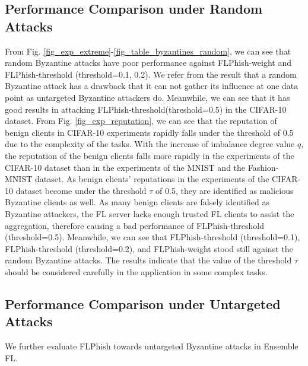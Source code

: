 \documentclass[journal]{IEEEtran}
\begin{document}
  \subsection{Performance Comparison under Random Attacks}
  From Fig. \ref{fig_exp_extreme}-\ref{fig_table_byzantines_random}, we can see that random Byzantine attacks have poor performance against FLPhish-weight and FLPhish-threshold (threshold=0.1, 0.2). We refer from the result that a random Byzantine attack has a drawback that it can not gather its influence at one data point as untargeted Byzantine attackers do. Meanwhile, we can see that it has good results in attacking FLPhish-threshold(threshold=0.5) in the CIFAR-10 dataset. From Fig. \ref{fig_exp_reputation}, we can see that the reputation of benign clients in CIFAR-10 experiments rapidly falls under the threshold of 0.5 due to the complexity of the tasks. With the increase of imbalance degree value $q$, the reputation of the benign clients falls more rapidly in the experiments of the CIFAR-10 dataset than in the experiments of the MNIST and the Fashion-MNIST dataset. As benign clients' reputations in the experiments of the CIFAR-10 dataset become under the threshold $\tau$ of 0.5, they are identified as malicious Byzantine clients as well. As many benign clients are falsely identified as Byzantine attackers, the FL server lacks enough trusted FL clients to assist the aggregation, therefore causing a bad performance of FLPhish-threshold (threshold=0.5). Meanwhile, we can see that FLPhish-threshold (threshold=0.1), FLPhish-threshold (threshold=0.2), and FLPhish-weight stood still against the random Byzantine attacks. The results indicate that the value of the threshold $\tau$ should be considered carefully in the application in some complex tasks.








  \subsection{{Performance Comparison under Untargeted Attacks}} We further evaluate FLPhish towards untargeted Byzantine attacks in Ensemble FL.
  

  
\end{document}
